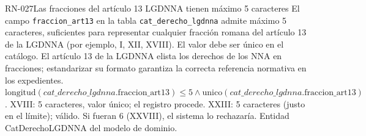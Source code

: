 \begin{BussinesRule}[%
	\brClassification{\btDerivation}{\bcIntegrity}{\blStrict}%
	]{RN-027}{Las fracciones del artículo 13 LGDNNA tienen máximo 5 caracteres}
	\BRitem[Descripción:] El campo \texttt{fraccion\_art13} en la tabla \texttt{cat\_derecho\_lgdnna} admite máximo 5 caracteres, suficientes para representar cualquier fracción romana del artículo 13 de la LGDNNA (por ejemplo, I, XII, XVIII). El valor debe ser único en el catálogo.
	\BRitem[Motivación:] El artículo 13 de la LGDNNA elista los derechos de los NNA en fracciones; estandarizar su formato garantiza la correcta referencia normativa en los expedientes.
	\BRitem[Sentencia:] $\text{longitud}(cat\_derecho\_lgdnna.\text{fraccion\_art13}) \le 5 \land \text{unico}(cat\_derecho\_lgdnna.\text{fraccion\_art13})$.
	 XVIII: 5 caracteres, valor único; el registro procede.
	 XXIII: 5 caracteres (justo en el límite); válido. Si fueran 6 (XXVIII), el sistema lo rechazaría.
	 Entidad CatDerechoLGDNNA del modelo de dominio.
\end{BussinesRule}